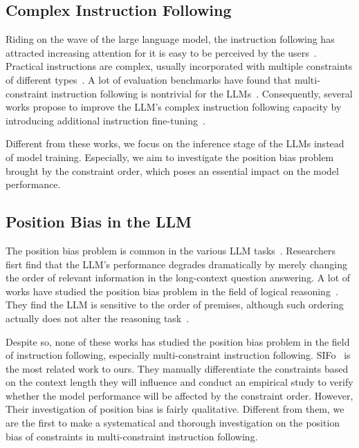 \subsection{Complex Instruction Following}
Riding on the wave of the large language model, the instruction following has attracted increasing attention for it is easy to be perceived by the users~\cite{zhou2023instructionfollowing, lou2024large}. Practical instructions are complex, usually incorporated with multiple constraints of different types~\cite{zhou2023instruction, he2024can}. A lot of evaluation benchmarks have found that multi-constraint instruction following is nontrivial for the LLMs~\cite{jiang2023followbench, wen2024benchmarking, qin2024infobench}. Consequently, several works propose to improve the LLM's complex instruction following capacity by introducing additional instruction fine-tuning~\cite{sun2024conifer, cheng2024spar, zhang2024divideverifyrefine}. 

Different from these works, we focus on the inference stage of the LLMs instead of model training. Especially, we aim to investigate the position bias problem brought by the constraint order, which poses an essential impact on the model performance.




\subsection{Position Bias in the LLM}
The position bias problem is common in the various LLM tasks~\cite{liu2024lost, zheng2023judging, zeng2023evaluating}. Researchers fisrt find that the LLM's performance degrades dramatically by merely changing the order of relevant information in the long-context question answering. A lot of works have studied the position bias problem in the field of logical reasoning~\cite{chenpremise, liu2023concise, berglund2023reversal}. They find the LLM is sensitive to the order of premises, although such ordering actually does not alter the reasoning task~\cite{chenpremise, liu2023concise}.  

Despite so, none of these works has studied the position bias problem in the field of instruction following, especially multi-constraint instruction following. SIFo~\cite{chen2024sifo} is the most related work to ours. They manually differentiate the constraints based on the context length they will influence and conduct an empirical study to verify whether the model performance will be affected by the constraint order. However, Their investigation of position bias is fairly qualitative. Different from them, we are the first to make a systematical and thorough investigation on the position bias of constraints in multi-constraint instruction following.